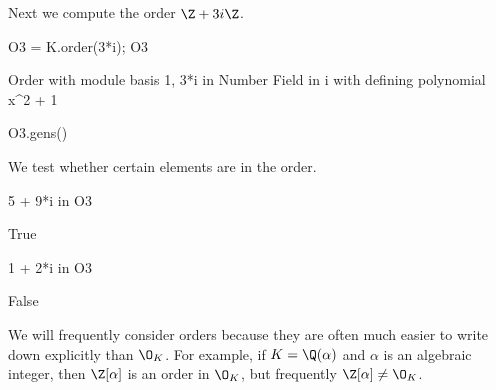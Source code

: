 \noindent Next we compute the order $\Z + 3i \Z$.
\begin{sagecode}
\begin{sagecell}
O3 = K.order(3*i); O3
\end{sagecell}
\begin{sageout}
Order with module basis 1, 3*i in Number Field in i with
defining polynomial x^2 + 1
\end{sageout}
\begin{sagecell}
O3.gens()
\end{sagecell}
\begin{sageout}
[1, 3*i]
\end{sageout}
\end{sagecode}


\noindent We test whether certain elements are in the order.
\begin{sagecode}
\begin{sagecell}
5 + 9*i in O3
\end{sagecell}
\begin{sageout}
True
\end{sageout}
\begin{sagecell}
1 + 2*i in O3
\end{sagecell}
\begin{sageout}
False
\end{sageout}
\end{sagecode}


We will frequently consider orders because they are often much easier
to write down explicitly than $\O_K$.  For example, if $K=\Q(\alpha)$
and $\alpha$ is an algebraic integer, then $\Z[\alpha]$ is an order in
$\O_K$, but frequently $\Z[\alpha]\neq \O_K$.

